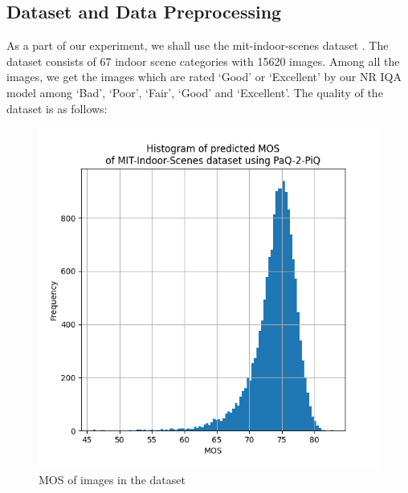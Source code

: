 \documentclass[10pt,twocolumn,letterpaper]{article}
\begin{document}
\subsection{Dataset and Data Preprocessing}
As a part of our experiment, we shall use the mit-indoor-scenes dataset \cite{mit-indoor-scenes}. The dataset consists of 67 indoor scene categories with 15620 images. Among all the images, we get the images which are rated `Good' or `Excellent' by our NR IQA model among `Bad', `Poor', `Fair', `Good' and `Excellent'. The quality of the dataset is as follows:
\begin{figure}[!ht]
    \centering
    \includegraphics[width=\columnwidth]{Images/MOS_Histogram.png}
    \caption{MOS of images in the dataset}
\end{figure}
\end{document}
